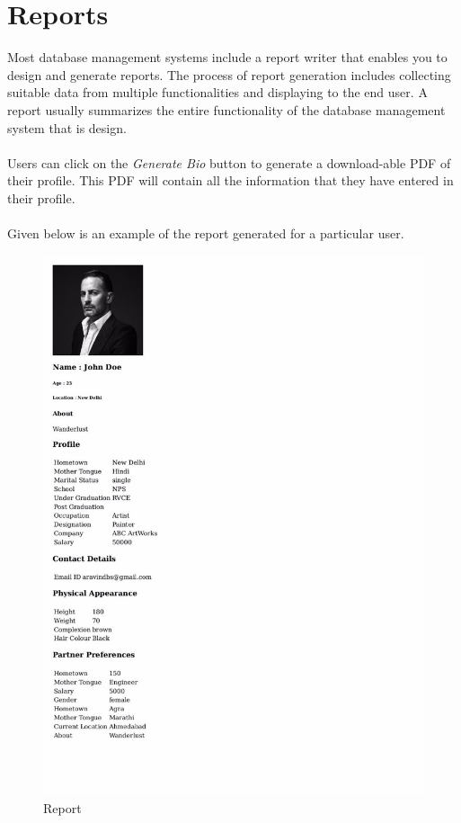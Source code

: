 \documentclass[12pt]{report}
\begin{document}
\chapter{Reports} 
Most database management systems include a report
writer that enables you to design and generate reports. The process of report generation includes
collecting suitable data from multiple functionalities and displaying to the end user. A report usually
summarizes the entire functionality of the database management system that is design. \\\\
Users can click on the \emph{Generate Bio} button to generate a download-able PDF of their profile. This PDF will contain all the information that they have entered in their profile. \\\\
Given below is an example of the report generated for a particular user.

\begin{figure}[!htb]
    \centering
    \includegraphics[width=.9\textwidth]{report.jpeg}
    \caption{Report}
    \label{fig:Report}
\end{figure} 
\end{document}
